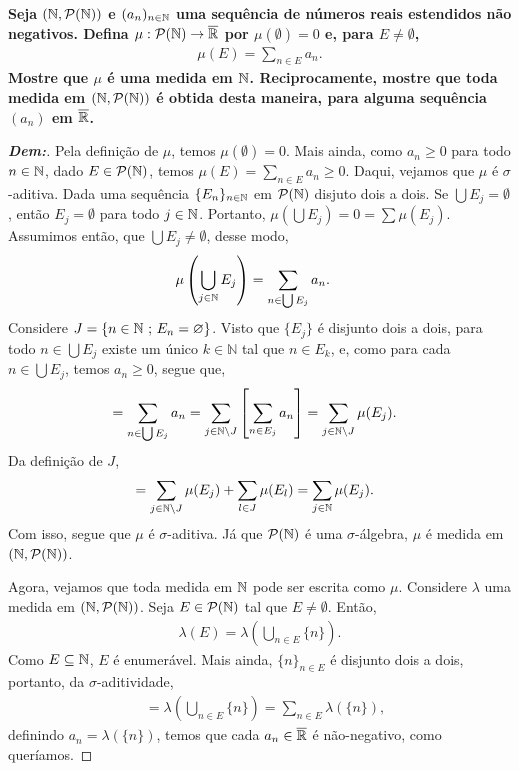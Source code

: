 \biglinend
\newpage 
{}
\myexe{\thedois}
\bigline
\textbf{Seja $(\mathbb N, \mathcal P(\mathbb N))$ e $(a_n)_{n \in \mathbb N}$ uma sequência 
de números reais estendidos não negativos. Defina $\mu: \mathcal P(\mathbb N) \rightarrow \overline {\mathbb R}$
por $\mu(\emptyset) = 0$ e, para $E \neq \emptyset$,
\begin{align*}
  \mu(E) = \sum_{n \in E} a_n.
\end{align*}
Mostre que $\mu$ é uma medida em $\mathbb N$. Reciprocamente, mostre que toda medida 
em $(\mathbb N, \mathcal P(\mathbb N))$ é obtida desta maneira, para alguma sequência 
$(a_n)$ em $\overline {\mathbb R}$.
}
\begin{proof}[\textbf{Dem:}]
  Pela definição de $\mu$, temos $\mu(\emptyset) = 0$. Mais ainda, como $a_n \ge 0$ para todo $n \in \mathbb N$, dado 
  $E \in \mathcal P(\mathbb N)$, temos
  $\mu(E) = \sum_{n \in E} a_n \ge 0$. Daqui, vejamos que $\mu$ é $\sigma$-aditiva. Dada uma sequência 
  $\{E_n\}_{n \in \mathbb N}$ em $\mathcal P(\mathbb N)$ disjuto dois a dois. Se $\bigcup E_j = \emptyset$, então $E_j = \emptyset$ para todo 
  $j \in \mathbb N$. Portanto, $\mu(\bigcup E_j) = 0 = \sum \mu(E_j)$. Assumimos então, que $\bigcup E_j \neq \emptyset$, 
  desse modo,
  \begin{align*}
    \mu\left(\bigcup\limits_{j \in \mathbb N} E_j\right) &= \sum_{n \in \bigcup E_j} a_n.
  \end{align*}
  Considere $J = \{n \in \mathbb N\text{ ; }  E_n = \varnothing\}$. Visto que $\{E_j\}$ é disjunto dois a dois,
  para todo $n \in \bigcup E_j$ existe um único $k \in \mathbb N$ tal que 
  $n \in E_k$, e, como para cada $n \in \bigcup E_j$, temos $a_n \ge 0$, segue que,
  \begin{align*}
    &= \sum_{n \in \bigcup E_j} a_n = \sum_{j \in \mathbb N \setminus J} \left[\sum_{n \in E_j} a_n\right]
    = \sum_{j \in \mathbb N \setminus J} \mu(E_j).
  \end{align*}
  Da definição de $J$, 
\begin{align*}
  &= \sum_{j \in \mathbb N \setminus J} \mu(E_j) + \sum_{l \in J}\mu(E_l) = \sum_{j \in \mathbb N} \mu(E_j).
\end{align*}
  Com isso, segue que $\mu$ é $\sigma$-aditiva. Já que $\mathcal P (\mathbb N)$ é uma $\sigma$-álgebra, $\mu$ é medida em 
  $(\mathbb N, \mathcal P (\mathbb N))$.

  Agora, vejamos que toda medida em $\mathbb N$ pode ser escrita como $\mu$. Considere $\lambda$ 
  uma medida em $(\mathbb N, \mathcal P (\mathbb N))$. Seja $E \in \mathcal P (\mathbb N)$ tal que $E \neq \emptyset$.
  Então, 
  \begin{align*}
    \lambda(E) = \lambda\left(\bigcup\limits_{n \in E} \{n\}\right).
  \end{align*}
  Como $E \subseteq \mathbb N$, $E$ é enumerável. Mais ainda, $\{n\}_{n \in E}$ é disjunto dois a dois, portanto, 
  da $\sigma$-aditividade, 
  \begin{align*}
    &= \lambda\left(\bigcup\limits_{n \in E} \{n\}\right) = \sum_{n \in E} \lambda(\{n\}),
  \end{align*}
  definindo $a_n = \lambda(\{n\})$, temos que cada $a_n \in \overline {\mathbb R}$ é não-negativo, 
  como queríamos.
\end{proof}

